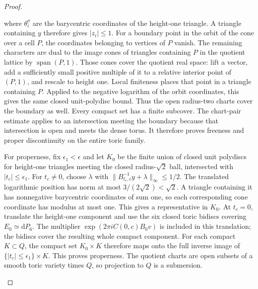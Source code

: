 \begin{proof}
\begin{enumerate}[label=\arabic*.,leftmargin=*]
\[\]
where $\theta_i^\sigma$ are the barycentric coordinates of the
height-one triangle. A triangle containing $y$ therefore gives
$|z_i|\le1$. For a boundary point in the orbit of the cone over a
cell $P$, the coordinates belonging to vertices of $P$ vanish.
The remaining characters are dual to the image cones of triangles
containing $P$ in the quotient lattice by $\operatorname{span}(P,1)$.
Those cones cover the quotient real space: lift a vector, add a
sufficiently small positive multiple of it to a relative interior
point of $(P,1)$, and rescale to height one. Local finiteness places
that point in a triangle containing $P$. Applied to the negative
logarithm of the orbit coordinates, this gives the same closed
unit-polydisc bound. Thus the open radius-two charts cover the
boundary as well. Every compact set has a finite subcover.
The chart-pair estimate applies to an intersection meeting the
boundary because that intersection is open and meets the dense
torus. It therefore proves freeness and proper discontinuity on
the entire toric family.

For properness, fix $\epsilon_1<\epsilon$ and let $K_0$ be the
finite union of closed unit polydiscs for height-one triangles
meeting the closed radius-$\sqrt2$ ball, intersected with
$|t_c|\le\epsilon_1$. For $t_c\ne0$, choose $\lambda$ with
$\|B_{t_c,c}^{-1}y+\lambda\|_\infty\le1/2$.
The translated logarithmic position has norm at most
$3/(2\sqrt2)<\sqrt2$. A triangle containing it has nonnegative
barycentric coordinates of sum one, so each corresponding cone
coordinate has modulus at most one. This gives a representative
in $K_0$. At $t_c=0$, translate the height-one component and use
the six closed toric bidiscs covering $E_0\simeq\mathrm dP_6$.
The multiplier $\exp(2\pi iC(0,c)B_0v)$ is included in this
translation; the bidiscs cover the resulting whole compact component.
For each compact $K\subset Q$, the compact set $K_0\times K$
therefore maps onto the full inverse image of
$\{|t_c|\le\epsilon_1\}\times K$. This proves properness.
The quotient charts are open subsets of a smooth toric variety
times $Q$, so projection to $Q$ is a submersion.


\end{enumerate}
\end{proof}

